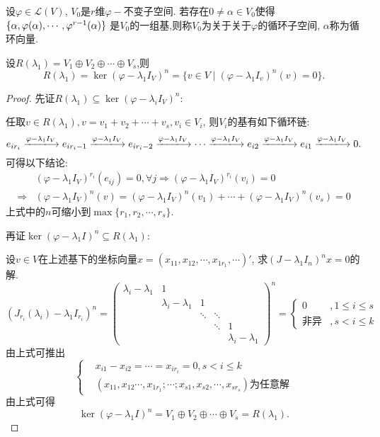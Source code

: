 \begin{definition}
  设$\varphi \in \mathcal{L}(V)$, $V_0$是$r$维$\varphi-$不变子空间.
  若存在$0 \neq \alpha \in V_0$使得
  $\{\alpha,\varphi(\alpha),\cdots,\\
  \varphi^{r-1}(\alpha)\}$
  是$V_0$的一组基,则称$V_0$为关于关于$\varphi$的循环子空间,
  $\alpha$称为循环向量.
\end{definition}

\begin{theory}\label{thr:JDapp1}
  设$R(\lambda_1)=V_1\oplus V_2 \oplus \cdots \oplus V_s$,则
  \[R(\lambda_1)=\ker(\varphi-\lambda_1 I_V)^n=
  \{v\in V \mid (\varphi-\lambda_1 I_v)^n(v)=0\}.\]
\end{theory}

\begin{proof}
  先证$R(\lambda_1) \subseteq \ker(\varphi-\lambda_i I_V)^n$:

  任取$v\in R(\lambda_1), v=v_1+v_2+\cdots+v_s, v_i\in V_i$,
  则$V_i$的基有如下循环链:
  \[e_{ir_i} \xlongrightarrow {\varphi-\lambda_1 I_V} e_{ir_i-1} \xlongrightarrow {\varphi-\lambda_1 I_V}
  e_{ir_i-2} \xlongrightarrow {\varphi-\lambda_1 I_V} \cdots \xlongrightarrow {\varphi-\lambda_1 I_V}
  e_{i2} \xlongrightarrow {\varphi-\lambda_1 I_V} e_{i1} \xlongrightarrow {\varphi-\lambda_1 I_V} 0.\]
可得以下结论:
\begin{align*}
  & (\varphi-\lambda_1 I_V)^{r_i}(e_{ij})=0, \forall j \Longrightarrow
  (\varphi-\lambda_1 I_V)^{r_i}(v_i)=0\\
  \Longrightarrow & (\varphi-\lambda_1 I_V)^n(v)=
  (\varphi-\lambda_1 I_V)^n(v_1)+\cdots+(\varphi-\lambda_1 I_V)^n(v_s)=0
\end{align*}
上式中的$n$可缩小到$\max\{r_1,r_2,\cdots,r_s\}$.

再证$\ker(\varphi-\lambda_1 I)^n\subseteq R(\lambda_1)$:

设$v\in V$在上述基下的坐标向量$x=(x_{11},x_{12},\cdots,x_{1r_1},\cdots)'$,
求$(J-\lambda_1 I_n)^nx=0$的解.
\[ (J_{r_i}(\lambda_i)-\lambda_1 I_{r_i})^n=
  \begin{pmatrix}
    \lambda_i-\lambda_1&1&&&\\
                       &\lambda_i-\lambda_1&1&&\\
                       &&\ddots&\ddots&\\
                       &&&\ddots&1\\
    &&&&\lambda_i-\lambda_1
  \end{pmatrix}^n=\left\{
    \begin{aligned}
      0& , 1 \leq i \leq s\\
      \text{非异}& , s < i \leq k
    \end{aligned}\right.
\]
由上式可推出
\[
\left\{
  \begin{aligned}
    & x_{i1}-x_{i2}=\cdots=x_{ir_i}=0 , s < i \leq k\\
    & (x_{11},x_{12}\cdots,x_{1r_1};\cdots;x_{s1},x_{s2},\cdots,x_{sr_s})
    \text{为任意解}
  \end{aligned}\right.
\]
由上式可得
\[\ker(\varphi-\lambda_1 I)^n =
  V_1\oplus V_2 \oplus \cdots \oplus V_s=R(\lambda_1).\]
\end{proof}

